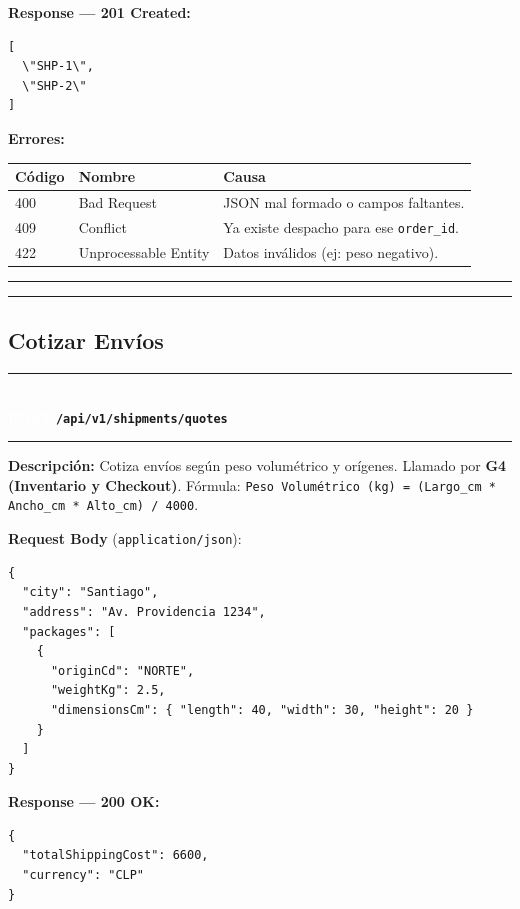 \documentclass[11pt, a4paper]{article}
\newcommand{\httpmethod}[2]{%
  \colorbox{#1}{\textcolor{white}{\textbf{\small\textsf{#2}}}}%
}
\newcommand{\routeheader}[3]{%
  \noindent\rule{\textwidth}{1.5pt}\\[0.3em]
  \httpmethod{#1}{#2}\;\texttt{\bfseries #3}\\[0.3em]
  \rule{\textwidth}{0.4pt}
  \vspace{0.3cm}
}
\begin{document}
\textbf{Response --- 201 Created:}

\begin{lstlisting}
[
  \"SHP-1\",
  \"SHP-2\"
]
\end{lstlisting}

\textbf{Errores:}
\begin{table}[h!]
\small
\begin{tabularx}{\textwidth}{l l X}
  \toprule
  \textbf{Código} & \textbf{Nombre} & \textbf{Causa} \\
  \midrule
  400 & Bad Request          & JSON mal formado o campos faltantes. \\
  409 & Conflict             & Ya existe despacho para ese \texttt{order\_id}. \\
  422 & Unprocessable Entity & Datos inválidos (ej: peso negativo). \\
  \bottomrule
\end{tabularx}
\end{table}

\noindent\rule{\textwidth}{0.4pt}


\noindent\rule{\textwidth}{0.4pt}

\subsection{Cotizar Envíos}

\routeheader{post}{POST}{/api/v1/shipments/quotes}

\textbf{Descripción:} Cotiza envíos según peso volumétrico y orígenes. Llamado por \textbf{G4 (Inventario y Checkout)}.
Fórmula: \texttt{Peso Volumétrico (kg) = (Largo\_cm * Ancho\_cm * Alto\_cm) / 4000}.

\vspace{0.3cm}
\textbf{Request Body} (\texttt{application/json}):

\begin{lstlisting}
{
  "city": "Santiago",
  "address": "Av. Providencia 1234",
  "packages": [
    {
      "originCd": "NORTE",
      "weightKg": 2.5,
      "dimensionsCm": { "length": 40, "width": 30, "height": 20 }
    }
  ]
}
\end{lstlisting}

\textbf{Response --- 200 OK:}

\begin{lstlisting}
{
  "totalShippingCost": 6600,
  "currency": "CLP"
}
\end{lstlisting}
\end{document}
